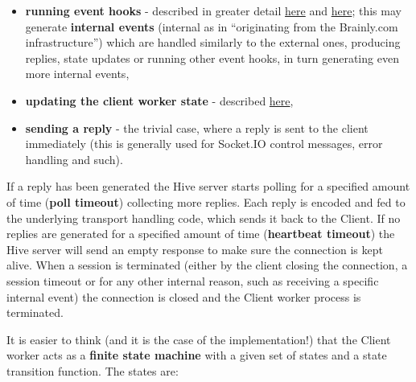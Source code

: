 \documentclass[a4paper]{article}
\begin{document}
\begin{itemize}
\item \textbf{running event hooks} - described in greater detail \hyperref[sec-7-1-4]{here} and \hyperref[sec-8-2]{here}; this may generate \textbf{internal events} (internal as in ``originating from the Brainly.com infrastructure'') which are handled similarly to the external ones, producing replies, state updates or running other event hooks, in turn generating even more internal events,
\item \textbf{updating the client worker state} - described \hyperref[sec-7-1-5]{here},
\item \textbf{sending a reply} - the trivial case, where a reply is sent to the client immediately (this is generally used for Socket.IO control messages, error handling and such).
\end{itemize}

\noindent
If a reply has been generated the Hive server starts polling for a specified amount of time (\textbf{poll timeout}) collecting more replies. Each reply is encoded and fed to the underlying transport handling code, which sends it back to the Client.
If no replies are generated for a specified amount of time (\textbf{heartbeat timeout}) the Hive server will send an empty response to make sure the connection is kept alive.
When a session is terminated (either by the client closing the connection, a session timeout or for any other internal reason, such as receiving a specific internal event) the connection is closed and the Client worker process is terminated.

It is easier to think (and it is the case of the implementation!) that the Client worker acts as a \textbf{finite state machine} with a given set of states and a state transition function. The states are:
\end{document}
